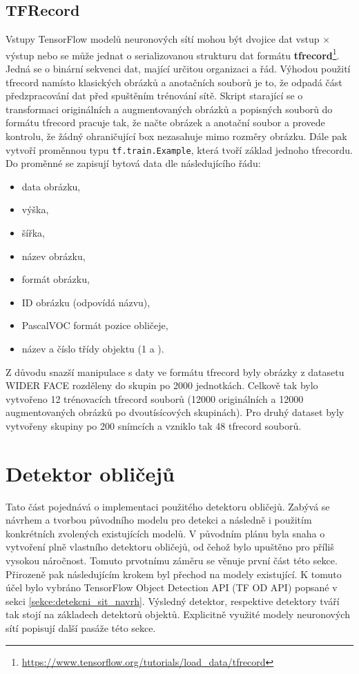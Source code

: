 \subsection*{TFRecord}
Vstupy TensorFlow modelů neuronových sítí mohou být dvojice dat vstup $\times$ výstup nebo se může jednat o serializovanou strukturu dat formátu \textbf{tfrecord}\footnote{\url{https://www.tensorflow.org/tutorials/load_data/tfrecord}}. Jedná se o binární sekvenci dat, mající určitou organizaci a řád. Výhodou použití tfrecord namísto klasických obrázků a anotačních souborů je to, že odpadá část předzpracování dat před spuštěním trénování sítě. Skript starající se o transformaci originálních a augmentovaných obrázků a popisných souborů do formátu tfrecord pracuje tak, že načte obrázek a anotační soubor a provede kontrolu, že žádný ohraničující box nezasahuje mimo rozměry obrázku. Dále pak vytvoří proměnnou typu \texttt{tf.train.Example}, která tvoří základ jednoho tfrecordu. Do proměnné se zapisují bytová data dle následujícího řádu:

\begin{itemize}
  \item data obrázku,
  \item výška,
  \item šířka,
  \item název obrázku,
  \item formát obrázku,
  \item ID obrázku (odpovídá názvu),
  \item PascalVOC formát pozice obličeje,
  \item název a číslo třídy objektu (1 a ).
\end{itemize}

Z důvodu snazší manipulace s daty ve formátu tfrecord byly obrázky z datasetu WIDER FACE rozděleny do skupin po 2000 jednotkách. Celkově tak bylo vytvořeno 12 trénovacích tfrecord souborů (12000 originálních a 12000 augmentovaných obrázků po dvoutísícových skupinách). Pro druhý dataset byly vytvořeny skupiny po 200 snímcích a vzniklo tak 48 tfrecord souborů.

\section{Detektor obličejů}
\label{sekce:detektor_obliceju_implementace}
Tato část pojednává o implementaci použitého detektoru obličejů. Zabývá se návrhem a tvorbou původního modelu pro detekci a následně i použitím konkrétních zvolených existujících modelů. V původním plánu byla snaha o vytvoření plně vlastního detektoru obličejů, od čehož bylo upuštěno pro příliš vysokou náročnost. Tomuto prvotnímu záměru se věnuje první část této sekce. Přirozeně pak následujícím krokem byl přechod na modely existující. K tomuto účel bylo vybráno TensorFlow Object Detection API (TF OD API) popsané v sekci \ref{sekce:detekcni_sit_navrh}. Výsledný detektor, respektive detektory tváří tak stojí na základech detektorů objektů. Explicitně využité modely neuronových sítí popisují další pasáže této sekce.

